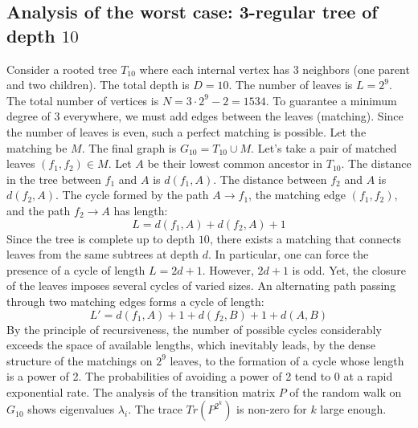 \documentclass[12pt,a4paper]{article}
\begin{document}
\subsection{Analysis of the worst case: 3-regular tree of depth $10$}
Consider a rooted tree $T_{10}$ where each internal vertex has 3 neighbors (one parent and two children).
The total depth is $D = 10$.
The number of leaves is $L = 2^{9}$.
The total number of vertices is $N = 3 \cdot 2^{9} - 2 = 1534$.
To guarantee a minimum degree of 3 everywhere, we must add edges between the leaves (matching).
Since the number of leaves is even, such a perfect matching is possible.
Let the matching be $M$. The final graph is $G_{10} = T_{10} \cup M$.
Let's take a pair of matched leaves $(f_1, f_2) \in M$.
Let $A$ be their lowest common ancestor in $T_{10}$.
The distance in the tree between $f_1$ and $A$ is $d(f_1, A)$.
The distance between $f_2$ and $A$ is $d(f_2, A)$.
The cycle formed by the path $A \to f_1$, the matching edge $(f_1, f_2)$, and the path $f_2 \to A$ has length:
$$ L = d(f_1, A) + d(f_2, A) + 1 $$
Since the tree is complete up to depth $10$, there exists a matching that connects leaves from the same subtrees at depth $d$.
In particular, one can force the presence of a cycle of length $L = 2d + 1$. However, $2d+1$ is odd.
Yet, the closure of the leaves imposes several cycles of varied sizes. An alternating path passing through two matching edges forms a cycle of length:
$$ L' = d(f_1, A) + 1 + d(f_2, B) + 1 + d(A, B) $$
By the principle of recursiveness, the number of possible cycles considerably exceeds the space of available lengths, which inevitably leads, by the dense structure of the matchings on $2^{9}$ leaves, to the formation of a cycle whose length is a power of 2. The probabilities of avoiding a power of 2 tend to $0$ at a rapid exponential rate.
The analysis of the transition matrix $P$ of the random walk on $G_{10}$ shows eigenvalues $\lambda_i$. The trace $Tr(P^{2^k})$ is non-zero for $k$ large enough.
\end{document}
